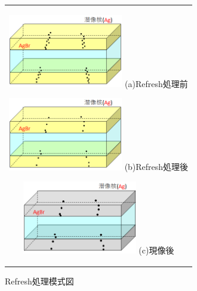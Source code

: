 \documentclass[12pt,a4paper]{jarticle}
\begin{document}
\begin{figure}[htbp]
  \centering
      \begin{tabular}{c}
        \begin{minipage}{0.33\hsize}
          \centering
            \includegraphics[clip, width=50mm]{ref_pro1.png}
            \hspace{1.6cm} (a)Refresh処理前
        \end{minipage}
        
        \begin{minipage}{0.33\hsize}
          \centering
            \includegraphics[clip, width=50mm]{ref_pro2.png}
            \hspace{1.6cm} (b)Refresh処理後
        \end{minipage}

        \begin{minipage}{0.33\hsize}
          \centering
            \includegraphics[clip, width=50mm]{ref_pro3.png}
            \hspace{1.6cm} (c)現像後
        \end{minipage}
    
      \end{tabular}
      \caption{Refresh処理模式図\label{fig:intr_refresh}}
\end{figure}
\end{document}
